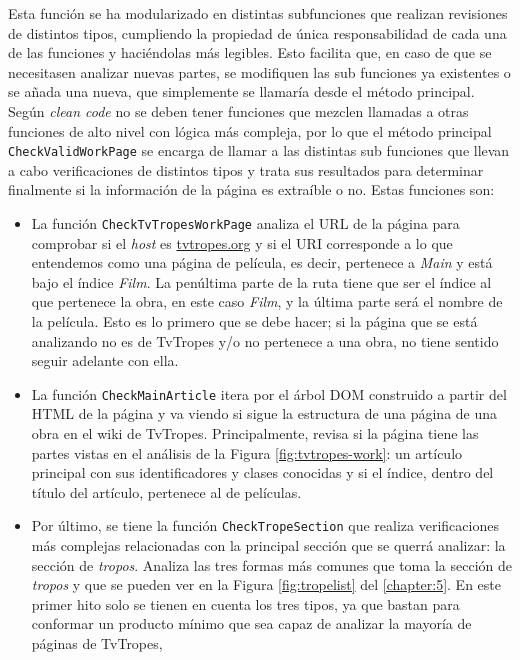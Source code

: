 Esta función se ha modularizado en distintas subfunciones que realizan
revisiones de distintos tipos, cumpliendo la propiedad de única
responsabilidad de cada una de las funciones y haciéndolas más legibles. Esto
facilita que, en caso de que se necesitasen analizar nuevas partes, se modifiquen
las sub funciones ya existentes o se añada una nueva, que simplemente se
llamaría desde el método principal. Según \textit{clean code} no se deben tener
funciones que mezclen llamadas a otras funciones de alto nivel con lógica más
compleja, por lo que el método principal \texttt{CheckValidWorkPage} se encarga
de llamar a las distintas sub funciones que llevan a cabo verificaciones de distintos
tipos y trata sus resultados para determinar finalmente si la información de la
página es extraíble o no. Estas funciones son:
\begin{itemize}
    \item La función \texttt{CheckTvTropesWorkPage} analiza el URL de la página
    para comprobar si el \textit{host} es \url{tvtropes.org} y si el URI
    corresponde a lo que entendemos como una página de película, es decir,
    pertenece a \textit{Main} y está bajo el índice \textit{Film}. La penúltima
    parte de la ruta tiene que ser el índice al que pertenece la obra, en este
    caso \textit{Film}, y la última parte será el nombre de la película. Esto es
    lo primero que se debe hacer; si la página que se está analizando no es de
    TvTropes y/o no pertenece a una obra, no tiene sentido seguir adelante con
    ella.
    \item La función \texttt{CheckMainArticle} itera por el árbol DOM construido
    a partir del HTML de la página y va viendo si sigue la estructura de una
    página de una obra en el wiki de TvTropes. Principalmente, revisa si la
    página tiene las partes vistas en el análisis de la Figura
    \ref{fig:tvtropes-work}: un artículo principal con sus identificadores y
    clases conocidas y si el índice, dentro del título del artículo, pertenece
    al de películas.
    \item Por último, se tiene la función \texttt{CheckTropeSection} que realiza
    verificaciones más complejas relacionadas con la principal sección que se
    querrá analizar: la sección de \textit{tropos}. Analiza las tres formas más
    comunes que toma la sección de \textit{tropos} y que se pueden ver en la
    Figura \ref{fig:tropelist} del \autoref{chapter:5}. En este primer hito solo
    se tienen en cuenta los tres tipos, ya que bastan para conformar un
    producto mínimo que sea capaz de analizar la mayoría de páginas de TvTropes,

\end{itemize}
